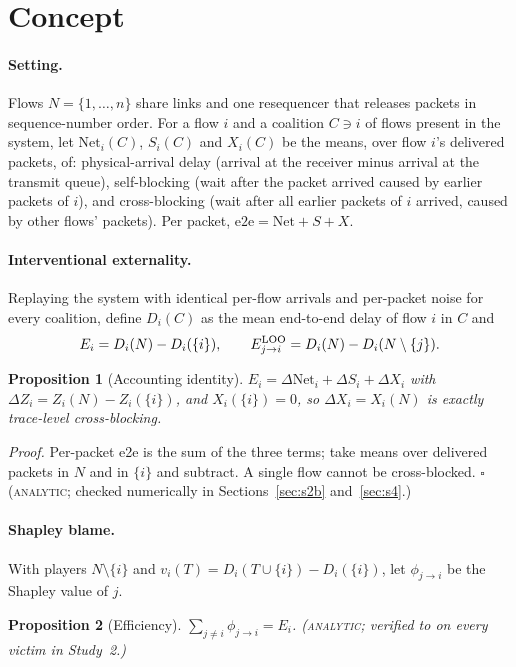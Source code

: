 \documentclass[11pt]{article}
\newcommand{\tagA}{\textsc{analytic}}
\newtheorem{proposition}{Proposition}
\begin{document}
\section{Concept}
\paragraph{Setting.} Flows $N=\{1,\dots,n\}$ share links and one resequencer that releases packets in sequence-number order. For a flow $i$ and a coalition $C\ni i$ of flows present in the system, let $\mathrm{Net}_i(C)$, $S_i(C)$ and $X_i(C)$ be the means, over flow $i$'s delivered packets, of: physical-arrival delay (arrival at the receiver minus arrival at the transmit queue), self-blocking (wait after the packet arrived caused by earlier packets of $i$), and cross-blocking (wait after all earlier packets of $i$ arrived, caused by other flows' packets). Per packet, $\mathrm{e2e}=\mathrm{Net}+S+X$.

\paragraph{Interventional externality.} Replaying the system with identical per-flow arrivals and per-packet noise for every coalition, define $D_i(C)$ as the mean end-to-end delay of flow $i$ in $C$ and
\[
E_i = D_i(N)-D_i(\{i\}),\qquad E_{j\to i}^{\rm LOO}=D_i(N)-D_i(N\setminus\{j\}).
\]
\begin{proposition}[Accounting identity]\label{prop:id}
$E_i=\Delta\mathrm{Net}_i+\Delta S_i+\Delta X_i$ with $\Delta Z_i=Z_i(N)-Z_i(\{i\})$, and $X_i(\{i\})=0$, so $\Delta X_i=X_i(N)$ is exactly trace-level cross-blocking.
\end{proposition}
\emph{Proof.} Per-packet e2e is the sum of the three terms; take means over delivered packets in $N$ and in $\{i\}$ and subtract. A single flow cannot be cross-blocked. \hfill$\square$ (\tagA{}; checked numerically in Sections~\ref{sec:s2b} and~\ref{sec:s4}.)

\paragraph{Shapley blame.} With players $N\setminus\{i\}$ and $v_i(T)=D_i(T\cup\{i\})-D_i(\{i\})$, let $\phi_{j\to i}$ be the Shapley value of $j$.
\begin{proposition}[Efficiency]\label{prop:eff}
$\sum_{j\ne i}\phi_{j\to i}=E_i$. \hfill (\tagA{}; verified to \SBVone{} on every victim in Study~2.)
\end{proposition}
\end{document}

